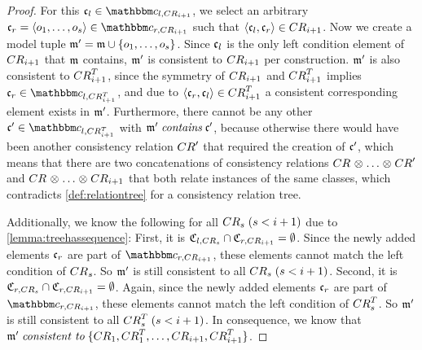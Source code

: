 \begin{proof}
    For this $\conditionelement{c}{l} \in \condition{c}{l,\consistencyrelation{CR}{i+1}}$, we select an arbitrary $\conditionelement{c}{r} = \tupled{\object{o}{1}, \dots, \object{o}{s}} \in \condition{c}{r, \consistencyrelation{CR}{i+1}}$ such that $\tupled{\conditionelement{c}{l}, \conditionelement{c}{r}} \in \consistencyrelation{CR}{i+1}$.
    Now we create a model tuple $\modeltuple{m'} = \modeltuple{m} \cup \setted{\object{o}{1}, \dots, \object{o}{s}}$.
    Since $\conditionelement{c}{l}$ is the only left condition element of $\consistencyrelation{CR}{i+1}$ that $\modeltuple{m}$ contains, $\modeltuple{m'}$ is consistent to $\consistencyrelation{CR}{i+1}$ per construction.
    $\modeltuple{m'}$ is also consistent to $\consistencyrelation{CR}{i+1}^T$, since the symmetry of $\consistencyrelation{CR}{i+1}$ and $\consistencyrelation{CR}{i+1}^T$ implies $\conditionelement{c}{r} \in \condition{c}{l,\consistencyrelation{CR}{i+1}^T}$, and due to $\tupled{\conditionelement{c}{r}, \conditionelement{c}{l}} \in \consistencyrelation{CR}{i+1}^T$ a consistent corresponding element exists in $\modeltuple{m'}$. 
    Furthermore, there cannot be any other $\conditionelement{c}{}' \in \condition{c}{l,\consistencyrelation{CR}{i+1}^T}$ with $\modeltuple{m'} \containsmath \conditionelement{c}{}'$, because otherwise there would have been another consistency relation $\consistencyrelation{CR}{}'$ that required the creation of $\conditionelement{c}{}'$, which means that there are two concatenations of consistency relations $\consistencyrelation{CR}{} \concat \dots \concat \consistencyrelation{CR}{}'$ and $\consistencyrelation{CR}{} \concat \dots \concat \consistencyrelation{CR}{i+1}$ that both relate instances of the same classes, which contradicts \autoref{def:relationtree} for a consistency relation tree.
    
    Additionally, we know the following for all $\consistencyrelation{CR}{s}\; (s < i+1)$ due to \autoref{lemma:treehassequence}: First, it is $\classtuple{C}{l,\consistencyrelation{CR}{s}} \cap \classtuple{C}{r,\consistencyrelation{CR}{i+1}} = \emptyset$.
    Since the newly added elements $\conditionelement{c}{r}$ are part of $\condition{c}{r,\consistencyrelation{CR}{i+1}}$, these elements cannot match the left condition of $\consistencyrelation{CR}{s}$.
    So $\modeltuple{m'}$ is still consistent to all $\consistencyrelation{CR}{s}\; (s < i+1)$.
    Second, it is $\classtuple{C}{r,\consistencyrelation{CR}{s}} \cap \classtuple{C}{r,\consistencyrelation{CR}{i+1}} = \emptyset$.
    Again, since the newly added elements $\conditionelement{c}{r}$ are part of $\condition{c}{r,\consistencyrelation{CR}{i+1}}$, these elements cannot match the left condition of $\consistencyrelation{CR}{s}^T$.
    So $\modeltuple{m'}$ is still consistent to all $\consistencyrelation{CR}{s}^T\; (s < i+1)$.
    In consequence, we know that $\modeltuple{m'} \consistenttomath \setted{\consistencyrelation{CR}{1}, \consistencyrelation{CR}{1}^T, \dots, \consistencyrelation{CR}{i+1}, \consistencyrelation{CR}{i+1}^T}$.
    

\end{proof}
